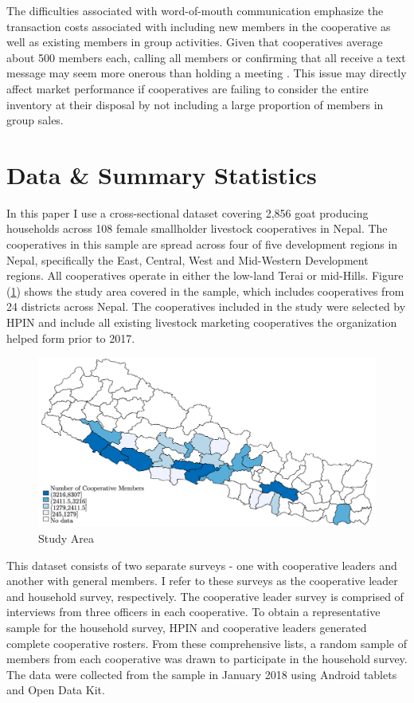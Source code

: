 \documentclass[11pt]{article}
\begin{document}
The difficulties associated with word-of-mouth communication emphasize the transaction costs associated with including new members in the cooperative as well as existing members in group activities. Given that cooperatives average about 500 members each, calling all members or confirming that all receive a text message may seem more onerous than holding a meeting \citep{mullally_impact_2020}. This issue may directly affect market performance if cooperatives are failing to consider the entire inventory at their disposal by not including a large proportion of members in group sales. 

\section{Data \& Summary Statistics} \label{sec:data}
In this paper I use a cross-sectional dataset covering 2,856 goat producing households across 108 female smallholder livestock cooperatives in Nepal. The cooperatives in this sample are spread across four of five development regions in Nepal, specifically the East, Central, West and Mid-Western Development regions. All cooperatives operate in either the low-land Terai or mid-Hills. Figure (\ref{map}) shows the study area covered in the sample, which includes cooperatives from 24 districts across Nepal. The cooperatives included in the study were selected by HPIN and include all existing livestock marketing cooperatives the organization helped form prior to 2017.

\begin{figure}[!h]
    \caption{Study Area}
    \label{map}
    \noindent \centering \includegraphics[width=.9\textwidth,trim=4 4 4 4,clip]{StudyMap.png}
\end{figure}

This dataset consists of two separate surveys - one with cooperative leaders and another with general members.  %
I refer to these surveys as the cooperative leader and household survey, respectively. The cooperative leader survey is comprised of interviews from three officers in each cooperative. To obtain a representative sample for the household survey, HPIN and cooperative leaders generated complete cooperative rosters. From these comprehensive lists, a random sample of members from each cooperative was drawn to participate in the household survey. The data were collected from the sample in January 2018 using Android tablets and Open Data Kit.
\end{document}
